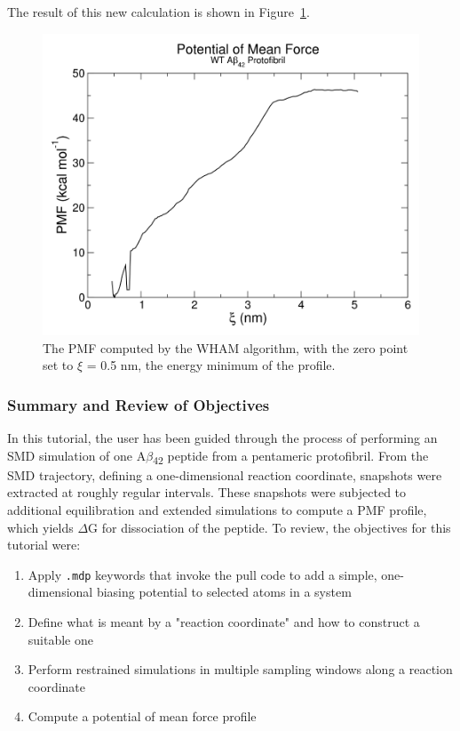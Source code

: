 \documentclass[9pt,tutorial]{livecoms}
\begin{document}
The result of this new calculation is shown in Figure~\ref{umbrella_pmf_shift_fig}.

\begin{figure}[h!]
\centering
\includegraphics{umbrella_pmf_shift}
\caption{The PMF computed by the WHAM algorithm, with the zero point set to $\xi$ = 0.5 nm, the energy minimum of the profile.}
\label{umbrella_pmf_shift_fig}
\end{figure}

\subsubsection{Summary and Review of Objectives} \label{umbrella_summary}

In this tutorial, the user has been guided through the process of performing an SMD simulation of one A$\beta$\textsubscript{42} peptide from a pentameric protofibril. From the SMD trajectory, defining a one-dimensional reaction coordinate, snapshots were extracted at roughly regular intervals. These snapshots were subjected to additional equilibration and extended simulations to compute a PMF profile, which yields $\Delta$G for dissociation of the peptide. To review, the objectives for this tutorial were:

\begin{enumerate}
	\item Apply \texttt{.mdp} keywords that invoke the pull code to add a simple, one-dimensional biasing potential to selected atoms in a system
	\item Define what is meant by a "reaction coordinate" and how to construct a suitable one
	\item Perform restrained simulations in multiple sampling windows along a reaction coordinate
	\item Compute a potential of mean force profile
\end{enumerate}
\end{document}
